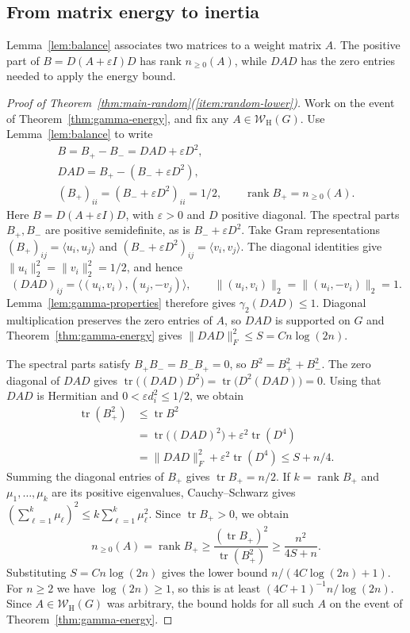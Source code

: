 \documentclass[11pt]{article}
\numberwithin{equation}{section}
\theoremstyle{definition}
\theoremstyle{remark}
\DeclareMathOperator{\tr}{tr}
\DeclareMathOperator{\rank}{rank}
\newcommand{\W}{\mathcal W_{\mathrm H}}
\begin{document}
\subsection{From matrix energy to inertia}

Lemma~\ref{lem:balance} associates two matrices to a weight matrix $A$.
The positive part of $B=D(A+\varepsilon I)D$ has rank $n_{\geq0}(A)$,
while $DAD$ has the zero entries needed to apply the energy bound.
\begin{proof}[Proof of Theorem~\ref{thm:main-random}(\ref{item:random-lower})]
Work on the event of Theorem~\ref{thm:gamma-energy}, and fix any
$A\in\W(G)$. Use Lemma~\ref{lem:balance} to write
\[
 \begin{gathered}
 B=B_+-B_-=DAD+\varepsilon D^2,\\
 DAD=B_+-(B_-+\varepsilon D^2),\\
 (B_+)_{ii}=(B_-+\varepsilon D^2)_{ii}=1/2,\qquad
 \rank B_+=n_{\geq0}(A).
 \end{gathered}
\]
Here $B=D(A+\varepsilon I)D$, with $\varepsilon>0$ and $D$ positive
diagonal. The spectral parts $B_+,B_-$ are positive semidefinite,
as is $B_-+\varepsilon D^2$.
Take Gram representations $(B_+)_{ij}=\langle u_i,u_j\rangle$ and
$(B_-+\varepsilon D^2)_{ij}=\langle v_i,v_j\rangle$.
The diagonal identities give $\|u_i\|_2^2=\|v_i\|_2^2=1/2$, and hence
\[
 (DAD)_{ij}=\langle(u_i,v_i),(u_j,-v_j)\rangle,
 \qquad \|(u_i,v_i)\|_2=\|(u_i,-v_i)\|_2=1.
\]
Lemma~\ref{lem:gamma-properties} therefore gives $\gamma_2(DAD)\leq1$.
Diagonal multiplication preserves the zero entries of $A$, so $DAD$ is
supported on $G$ and
Theorem~\ref{thm:gamma-energy} gives $\|DAD\|_F^2\leq S=Cn\log(2n)$.

The spectral parts satisfy $B_+B_-=B_-B_+=0$, so $B^2=B_+^2+B_-^2$.
The zero diagonal of $DAD$ gives
$\tr\bigl((DAD)D^2\bigr)=\tr\bigl(D^2(DAD)\bigr)=0$.
Using that $DAD$ is Hermitian and $0<\varepsilon d_i^2\leq1/2$, we obtain
\[
 \begin{aligned}
 \tr(B_+^2)
 &\leq\tr B^2\\
 &=\tr\bigl((DAD)^2\bigr)+\varepsilon^2\tr(D^4)\\
 &=\|DAD\|_F^2+\varepsilon^2\tr(D^4)
 \leq S+n/4.
 \end{aligned}
\]
Summing the diagonal entries of $B_+$ gives $\tr B_+=n/2$.
If $k=\rank B_+$ and $\mu_1,\ldots,\mu_k$ are its positive
eigenvalues, Cauchy--Schwarz gives
$(\sum_{\ell=1}^k\mu_\ell)^2\leq k\sum_{\ell=1}^k\mu_\ell^2$.
Since $\tr B_+>0$, we obtain
\[
 n_{\geq0}(A)=\rank B_+
 \geq\frac{(\tr B_+)^2}{\tr(B_+^2)}
 \geq\frac{n^2}{4S+n}.
\]
Substituting $S=Cn\log(2n)$ gives the lower bound $n/(4C\log(2n)+1)$.
For $n\geq2$ we have $\log(2n)\geq1$, so this is at least
$(4C+1)^{-1}n/\log(2n)$.
Since $A\in\W(G)$ was arbitrary, the bound holds for all such $A$ on
the event of Theorem~\ref{thm:gamma-energy}.
\end{proof}
\end{document}
